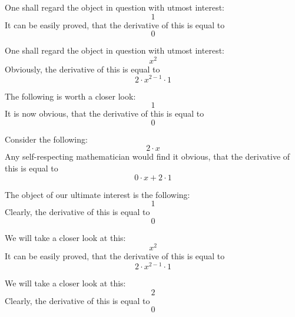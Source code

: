 \documentclass{article}
\begin{document}
One shall regard the object in question with utmost interest:
\begin{equation}
1 
\end{equation}
It can be easily proved, that the derivative of this is equal to
\begin{equation}
0 
\end{equation}

One shall regard the object in question with utmost interest:
\begin{equation}
x ^{2 } 
\end{equation}
Obviously, the derivative of this is equal to
\begin{equation}
2 \cdot x ^{2 - 1 } \cdot 1 
\end{equation}

The following is worth a closer look:
\begin{equation}
1 
\end{equation}
It is now obvious, that the derivative of this is equal to
\begin{equation}
0 
\end{equation}

Consider the following:
\begin{equation}
2 \cdot x 
\end{equation}
Any self-respecting mathematician would find it obvious, that the derivative of this is equal to
\begin{equation}
0 \cdot x + 2 \cdot 1 
\end{equation}

The object of our ultimate interest is the following:
\begin{equation}
1 
\end{equation}
Clearly, the derivative of this is equal to
\begin{equation}
0 
\end{equation}

We will take a closer look at this:
\begin{equation}
x ^{2 } 
\end{equation}
It can be easily proved, that the derivative of this is equal to
\begin{equation}
2 \cdot x ^{2 - 1 } \cdot 1 
\end{equation}

We will take a closer look at this:
\begin{equation}
2 
\end{equation}
Clearly, the derivative of this is equal to
\begin{equation}
0 
\end{equation}
\end{document}
